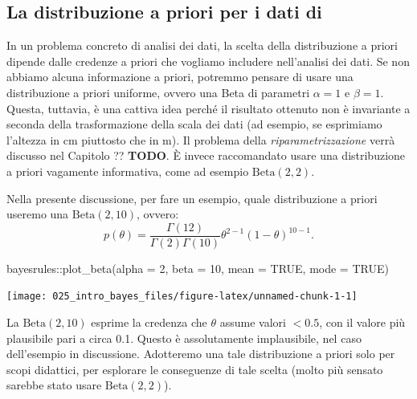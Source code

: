 \documentclass[
  10pt,
  italian,
  a4paper,
  extrafontsizes,onecolumn,openright
  ]{memoir}
\newenvironment{Shaded}{\begin{snugshade}}{\end{snugshade}}
\newcommand{\AttributeTok}[1]{\textcolor[rgb]{0.77,0.63,0.00}{#1}}
\newcommand{\ConstantTok}[1]{\textcolor[rgb]{0.00,0.00,0.00}{#1}}
\newcommand{\DecValTok}[1]{\textcolor[rgb]{0.00,0.00,0.81}{#1}}
\newcommand{\FunctionTok}[1]{\textcolor[rgb]{0.00,0.00,0.00}{#1}}
\newcommand{\NormalTok}[1]{#1}
\newcommand{\SpecialCharTok}[1]{\textcolor[rgb]{0.00,0.00,0.00}{#1}}
\theoremstyle{definition}
\theoremstyle{definition}
\theoremstyle{definition}
\theoremstyle{definition}
\theoremstyle{remark}
\begin{document}
\hypertarget{la-distribuzione-a-priori-per-i-dati-di-zetschefuture2019}{%
\subsection{\texorpdfstring{La distribuzione a priori per i dati di \textcite{zetschefuture2019}}{La distribuzione a priori per i dati di @zetschefuture2019}}\label{la-distribuzione-a-priori-per-i-dati-di-zetschefuture2019}}

In un problema concreto di analisi dei dati, la scelta della distribuzione a priori dipende dalle credenze a priori che vogliamo includere nell'analisi dei dati. Se non abbiamo alcuna informazione a priori, potremmo pensare di usare una distribuzione a priori uniforme, ovvero una Beta di parametri \(\alpha=1\) e \(\beta=1\). Questa, tuttavia, è una cattiva idea perché il risultato ottenuto non è invariante a seconda della trasformazione della scala dei dati (ad esempio, se esprimiamo l'altezza in cm piuttosto che in m). Il problema della \emph{riparametrizzazione} verrà discusso nel Capitolo ?? \textbf{TODO}. È invece raccomandato usare una distribuzione a priori vagamente informativa, come ad esempio \(\text{Beta}(2, 2)\).

Nella presente discussione, per fare un esempio, quale distribuzione a priori useremo una \(\mbox{Beta}(2, 10)\), ovvero:
\[
p(\theta) = \frac{\Gamma(12)}{\Gamma(2)\Gamma(10)}\theta^{2-1} (1-\theta)^{10-1}.
\]

\begin{Shaded}
\begin{Highlighting}[]
\NormalTok{bayesrules}\SpecialCharTok{::}\FunctionTok{plot\_beta}\NormalTok{(}\AttributeTok{alpha =} \DecValTok{2}\NormalTok{, }\AttributeTok{beta =} \DecValTok{10}\NormalTok{, }\AttributeTok{mean =} \ConstantTok{TRUE}\NormalTok{, }\AttributeTok{mode =} \ConstantTok{TRUE}\NormalTok{)}
\end{Highlighting}
\end{Shaded}

\begin{center}\texttt{[image: 025\_intro\_bayes\_files/figure-latex/unnamed-chunk-1-1]} \end{center}

\noindent
La \(\mbox{Beta}(2, 10)\) esprime la credenza che \(\theta\) assume valori \(< 0.5\), con il valore più plausibile pari a circa 0.1. Questo è assolutamente implausibile, nel caso dell'esempio in discussione. Adotteremo una tale distribuzione a priori solo per scopi didattici, per esplorare le conseguenze di tale scelta (molto più sensato sarebbe stato usare \(\text{Beta}(2, 2)\)).
\end{document}
